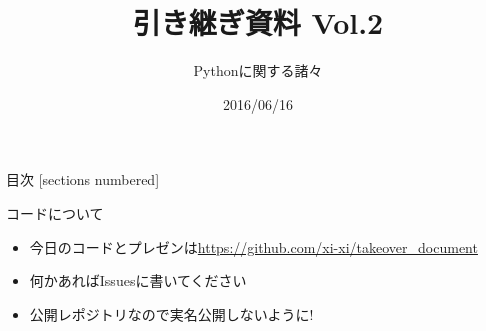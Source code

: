 \documentclass[12pt, dvipdfmx]{beamer}
\title{引き継ぎ資料 Vol.2}
\subtitle{Pythonに関する諸々}
\date{2016/06/16}
\author{}
\institute{}
\begin{document}
\maketitle
\begin{frame}{目次}
  [sections numbered]
  \tableofcontents[hideallsubsections]
\end{frame}
\begin{frame}{コードについて}
    \begin{itemize}
        \item 今日のコードとプレゼンは\url{https://github.com/xi-xi/takeover_document}

        \item \alert{何かあればIssuesに書いてください}
        \item 公開レポジトリなので実名公開しないように!
    \end{itemize}
\end{frame}
\end{document}
